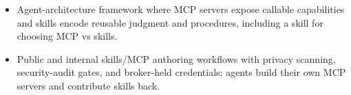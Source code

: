 \begin{itemize}
  \item Agent-architecture framework where MCP servers expose callable capabilities and skills encode reusable judgment and procedures, including a skill for choosing MCP vs skills.
  \item Public and internal skills/MCP authoring workflows with privacy scanning, security-audit gates, and broker-held credentials; agents build their own MCP servers and contribute skills back.
\end{itemize}
